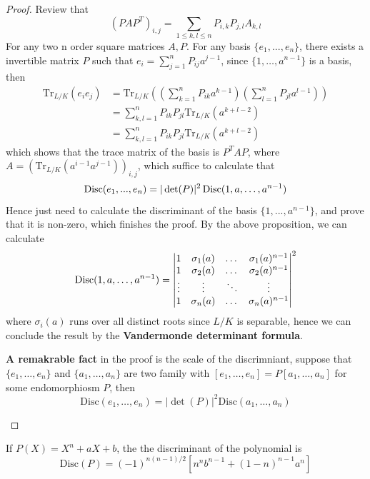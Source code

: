 \begin{proof}
  Review that 
  \[(PAP^T)_{i,j}  = \sum_{1\leq k,l \leq n}P_{i,k}P_{j,l}A_{k,l}\]
  For any two n order square matrices \(A,P\).
  For any basis \(\{e_1,...,e_n\}\), there exists a invertible matrix \(P\) such that \(e_i = \sum_{j=1}^n P_{ij} a^{j-1}\), since \(\{1,\dots,a^{n-1}\}\) is a basis, then 
  \begin{align*}
    \mathrm{Tr}_{L/K}(e_ie_j) &= \mathrm{Tr}_{L/K}\left(\left(\sum_{k=1}^n P_{ik} a^{k-1}\right)\left(\sum_{l=1}^n P_{jl} a^{l-1}\right)\right) \\
    &= \sum_{k,l=1}^n P_{ik}P_{jl}\mathrm{Tr}_{L/K}(a^{k+l-2}) \\
    &= \sum_{k,l=1}^n P_{ik}P_{jl}\mathrm{Tr}_{L/K}(a^{k+l-2})
  \end{align*}
  which shows that the trace matrix of the basis is \(P^T A P\), where \(A = (\mathrm{Tr}_{L/K}(a^{i-1}a^{j-1}))_{i,j}\), which suffice to calculate that
  \[\operatorname{Disc}(e_1,...,e_n) = |\det(P)|^2 \operatorname{Disc}(1,a,\dots,a^{n-1}) \]
  Hence just need to calculate the discriminant of the basis \(\{1,...,a^{n-1}\}\), and prove that it is non-zero, which finishes the proof. By the above proposition, we can calculate
  \[\operatorname{Disc}(1,a,\dots,a^{n-1}) = \begin{vmatrix}
    1 & \sigma_1(a) & \dots & \sigma_1(a)^{n-1} \\
    1 & \sigma_2(a) & \dots & \sigma_2(a)^{n-1} \\
    \vdots & \vdots & \ddots & \vdots \\ 
    1 & \sigma_n(a) & \dots & \sigma_n(a)^{n-1}
  \end{vmatrix}^2\]
  where \(\sigma_i(a)\) runs over all distinct roots since \(L/K\) is separable, hence we can conclude the result by the \textbf{Vandermonde determinant formula}.

  \begin{remark}
    \textbf{A remakrable fact} in the proof is the scale of the discrimniant, suppose that \(\{e_1,\dots,e_n\}\) and \(\{a_1,\dots,a_n\}\) are two family with \([e_1,\dots,e_n] = P[a_1,\dots,a_n]\) for some endomorphiosm \(P\), then 
    \[\mathrm{Disc}(e_1,\dots,e_n) = |\det(P)|^2 \mathrm{Disc}(a_1,\dots,a_n)\]
  \end{remark}

\end{proof}

\begin{colorexample}
    If \(P(X) = X^n+aX+b\), the the discriminant of the polynomial is 
    \[\mathrm{Disc}(P) = (-1)^{n(n-1)/2}[n^nb^{n-1} + (1-n)^{n-1}a^n]\]
\end{colorexample}
